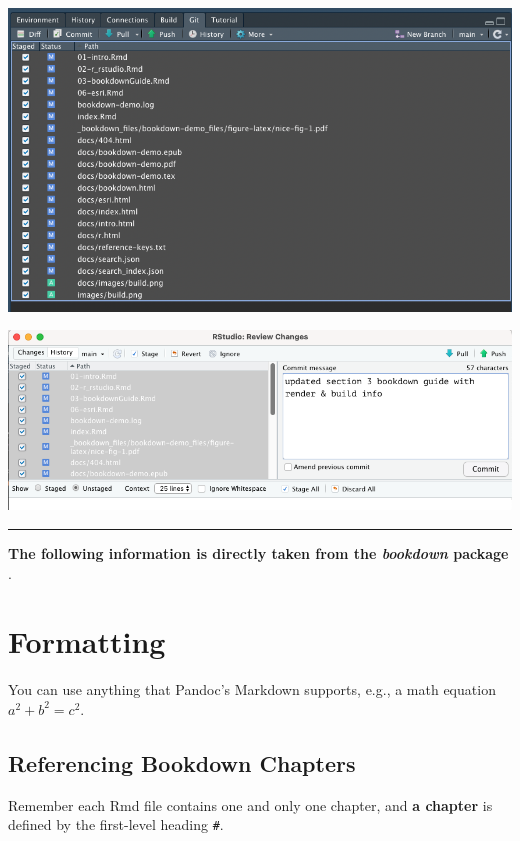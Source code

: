 \documentclass[
]{book}
\begin{document}
\begin{center}\includegraphics[width=0.75\linewidth]{images/select} \end{center}

\begin{center}\includegraphics[width=0.75\linewidth]{images/commit} \end{center}

\begin{center}\rule{0.5\linewidth}{0.5pt}\end{center}

\textbf{The following information is directly taken from the \emph{bookdown} package} \citep{R-bookdown}.

\hypertarget{formatting}{%
\section{Formatting}\label{formatting}}

You can use anything that Pandoc's Markdown supports, e.g., a math equation \(a^2 + b^2 = c^2\).

\hypertarget{referencing-bookdown-chapters}{%
\subsection{Referencing Bookdown Chapters}\label{referencing-bookdown-chapters}}

Remember each Rmd file contains one and only one chapter, and \textbf{a chapter} is defined by the first-level heading \texttt{\#}.
\end{document}
